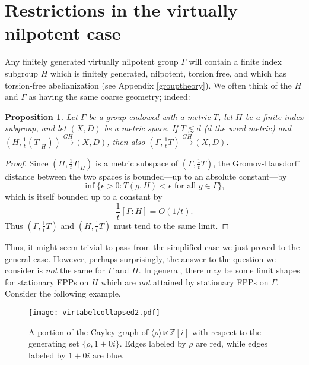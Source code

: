 \documentclass[12pt,reqno]{article}
\numberwithin{equation}{section}
\newtheorem{prop}{Proposition}
\begin{document}
\section{Restrictions in the virtually nilpotent case} \label{restrictions}

Any finitely generated virtually nilpotent group $\Gamma$ will contain a finite index subgroup $H$ which is finitely generated, nilpotent, torsion free, 
and which has torsion-free abelianization (see Appendix \ref{grouptheory}). We often think of the $H$ and $\Gamma$ as having the same coarse
geometry; indeed:
\begin{prop} \label{prop:finiteindex}
Let $\Gamma$ be a group endowed with a metric $T$, let $H$ be a finite index subgroup, and let $(X,D)$ be a metric space. If $T \lesssim d$ ($d$
the word metric) and $(H, \frac{1}{t} (T|_H)) \xrightarrow{GH} (X,D)$, then also $(\Gamma, \frac{1}{t} T) \xrightarrow{GH} (X,D)$.
\end{prop}
\begin{proof}
Since $(H, \frac{1}{t} T|_H)$ is a metric subspace of $(\Gamma,  \frac{1}{t} T)$, 
the Gromov-Hausdorff distance between the two spaces is bounded---up to an absolute constant---by
\[ \inf \{ \epsilon > 0 : T(g,H) < \epsilon \mbox{ for all } g \in \Gamma \}, \]
which is itself bounded up to a constant by 
\[ \frac{1}{t}[\Gamma:H] = O(1/t). \]
Thus $(\Gamma,\frac{1}{t}T)$ and $(H, \frac{1}{t}T)$ must tend to the same limit.
\end{proof}

Thus, it might seem trivial to pass from the simplified case we just proved to the general case.
However, perhaps surprisingly, the answer to the question we consider is \emph{not} the same for $\Gamma$ and $H$. In general, there may be some limit shapes for stationary FPPs on $H$ which are \emph{not} attained by stationary FPPs on $\Gamma$. Consider the following example.

\begin{figure}[t]
   \centering
   \texttt{[image: virtabelcollapsed2.pdf]}
   \caption{A portion of the Cayley graph of $\langle \rho \rangle \ltimes \mathbb{Z}[i]$ 
   with respect to the generating set $\{\rho, 1+0i\}$. 
   Edges labeled by $\rho$ are red, while edges labeled by $1+0i$ are blue.}
\end{figure}
\end{document}
